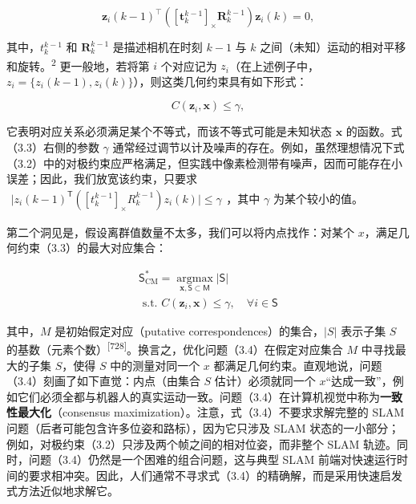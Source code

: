 \begin{equation}
\boldsymbol {z} _ {i} (k - 1) ^ {\top} \left([ \boldsymbol {t} _ {k} ^ {k - 1} ] _ {\times} \boldsymbol {R} _ {k} ^ {k - 1}\right) \boldsymbol {z} _ {i} (k) = 0,\tag{3.2}
\end{equation}

其中，$t _ { k } ^ { k - 1 }$ 和 $\pmb { R } _ { k } ^ { k - 1 }$ 是描述相机在时刻 $k - 1$ 与 $k$ 之间（未知）运动的相对平移和旋转。\textsuperscript{2} 更一般地，若将第 $i$ 个对应记为 $z _ { i }$（在上述例子中，$z _ { i } = \{ z _ { i } ( k - 1 ) , z _ { i } ( k ) \}$），则这类几何约束具有如下形式：

\begin{equation}
C (\boldsymbol {z} _ {i}, \boldsymbol {x}) \leq \gamma ,\tag{3.3}
\end{equation}

它表明对应关系必须满足某个不等式，而该不等式可能是未知状态 $\boldsymbol{x}$ 的函数。式（3.3）右侧的参数 $\gamma$ 通常经过调节以计及噪声的存在。例如，虽然理想情况下式（3.2）中的对极约束应严格满足，但实践中像素检测带有噪声，因而可能存在小误差；因此，我们放宽该约束，只要求 $\begin{array} { r } { | z _ { i } ( k - 1 ) ^ { \mathsf { T } } \left( [ t _ { k } ^ { k - 1 } ] _ { \times } R _ { k } ^ { k - 1 } \right) z _ { i } ( k ) \vert \leq \gamma } \end{array}$，其中 $\gamma$ 为某个较小的值。

第二个洞见是，假设离群值数量不太多，我们可以将内点找作：对某个 $x$，满足几何约束（3.3）的最大对应集合：

\begin{equation}
\begin{array}{c} \mathsf {S} _ {\mathrm{CM}} ^ {*} = \underset {\boldsymbol {x}, \mathsf {S} \subset \mathsf {M}} {\operatorname{argmax}}   | \mathsf {S} | \\ \text { s.t. } C (\boldsymbol {z} _ {i}, \boldsymbol {x}) \leq \gamma , \quad \forall i \in \mathsf {S} \end{array}\tag{3.4}
\end{equation}

其中，$M$ 是初始假定对应（putative correspondences）的集合，$|S|$ 表示子集 $S$ 的基数（元素个数）\textsuperscript{[728]}。换言之，优化问题（3.4）在假定对应集合 $M$ 中寻找最大的子集 $S$，使得 $S$ 中的测量对同一个 $x$ 都满足几何约束。直观地说，问题（3.4）刻画了如下直觉：内点（由集合 $S$ 估计）必须就同一个 $x$“达成一致”，例如它们必须全都与机器人的真实运动一致。问题（3.4）在计算机视觉中称为\textbf{一致性最大化}（consensus maximization）。注意，式（3.4）不要求求解完整的 SLAM 问题（后者可能包含许多位姿和路标），因为它只涉及 SLAM 状态的一小部分；例如，对极约束（3.2）只涉及两个帧之间的相对位姿，而非整个 SLAM 轨迹。同时，问题（3.4）仍然是一个困难的组合问题，这与典型 SLAM 前端对快速运行时间的要求相冲突。因此，人们通常不寻求式（3.4）的精确解，而是采用快速启发式方法近似地求解它。

